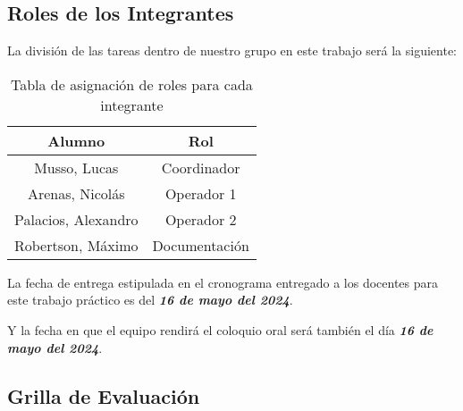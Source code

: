 
\subsection{Roles de los Integrantes}

La división de las tareas dentro de nuestro grupo en este trabajo será la siguiente: 

\begin{table}[h!]
    \centering
    \begin{tabular}{|c|c|}
    \hline
        Alumno & Rol \\
    \hline
        Musso, Lucas & Coordinador \\ 
        Arenas, Nicolás & Operador 1 \\
        Palacios, Alexandro & Operador 2 \\
        Robertson, Máximo & Documentación \\
    \hline
        \end{tabular}
        \def\tablename{Tabla} 
        \caption{Tabla de asignación de roles para cada integrante}
        \label{tab:roles}
\end{table}

La fecha de entrega estipulada en el cronograma entregado a los docentes para este trabajo práctico es del \textbf{\textit{16 de mayo del 2024}}.

Y la fecha en que el equipo rendirá el coloquio oral será también el día \textbf{\textit{16 de mayo del 2024}}.



\subsection{Grilla de Evaluación}

